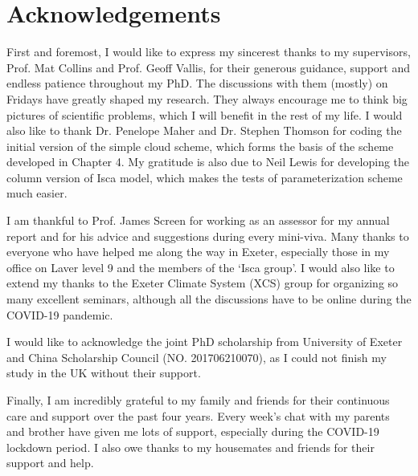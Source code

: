 \makedeclaration

\newpage
\chapter*{Acknowledgements}
First and foremost, I would like to express my sincerest thanks to my supervisors, Prof. Mat Collins and Prof. Geoff Vallis, for their generous guidance, support and endless patience throughout my PhD. The discussions with them (mostly) on Fridays have greatly shaped my research. They always encourage me to think big pictures of scientific problems, which I will benefit in the rest of my life. I would also like to thank Dr. Penelope Maher and Dr. Stephen Thomson for coding the initial version of the simple cloud scheme, which forms the basis of the scheme developed in Chapter 4. My gratitude is also due to Neil Lewis for developing the column version of Isca model, which makes the tests of parameterization scheme much easier.

I am thankful to Prof. James Screen for working as an assessor for my annual report and for his advice and suggestions during every mini-viva. Many thanks to everyone who have helped me along the way in Exeter, especially those in my office on Laver level 9 and the members of the `Isca group'. I would also like to extend my thanks to the Exeter Climate System (XCS) group for organizing so many excellent seminars, although all the discussions have to be online during the COVID-19 pandemic.


I would like to acknowledge the joint PhD scholarship from University of Exeter and China Scholarship Council (NO. 201706210070), as I could not finish my study in the UK without their support.

Finally, I am incredibly grateful to my family and friends for their continuous care and support over the past four years. Every week's chat with my parents and brother have given me lots of support, especially during the COVID-19 lockdown period. I also owe thanks to my housemates and friends for their support and help.

